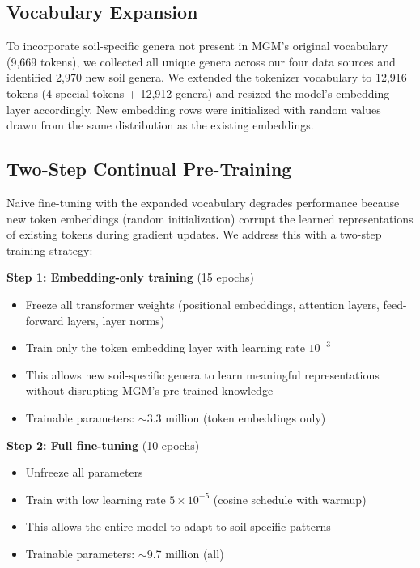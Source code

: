 \documentclass[11pt,a4paper]{article}
\begin{document}
\subsection{Vocabulary Expansion}

To incorporate soil-specific genera not present in MGM's original vocabulary (9,669 tokens), we collected all unique genera across our four data sources and identified 2,970 new soil genera. We extended the tokenizer vocabulary to 12,916 tokens (4 special tokens + 12,912 genera) and resized the model's embedding layer accordingly. New embedding rows were initialized with random values drawn from the same distribution as the existing embeddings.

\subsection{Two-Step Continual Pre-Training}

Naive fine-tuning with the expanded vocabulary degrades performance because new token embeddings (random initialization) corrupt the learned representations of existing tokens during gradient updates. We address this with a two-step training strategy:

\textbf{Step 1: Embedding-only training} (15 epochs)
\begin{itemize}[leftmargin=1.5em]
    \item Freeze all transformer weights (positional embeddings, attention layers, feed-forward layers, layer norms)
    \item Train only the token embedding layer with learning rate $10^{-3}$
    \item This allows new soil-specific genera to learn meaningful representations without disrupting MGM's pre-trained knowledge
    \item Trainable parameters: $\sim$3.3 million (token embeddings only)
\end{itemize}

\textbf{Step 2: Full fine-tuning} (10 epochs)
\begin{itemize}[leftmargin=1.5em]
    \item Unfreeze all parameters
    \item Train with low learning rate $5 \times 10^{-5}$ (cosine schedule with warmup)
    \item This allows the entire model to adapt to soil-specific patterns
    \item Trainable parameters: $\sim$9.7 million (all)
\end{itemize}
\end{document}
